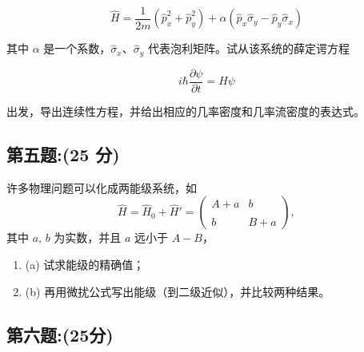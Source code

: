 \begin{equation}
    \hat{H} = \frac{1}{2m} \left( \hat{p}_x^2 + \hat{p}_y^2 \right) + \alpha \left( \hat{p}_x \hat{\sigma}_y - \hat{p}_y \hat{\sigma}_x \right)~
\end{equation}

其中 $\alpha$ 是一个系数，$\hat{\sigma}_x$、$\hat{\sigma}_y$ 代表泡利矩阵。试从该系统的薛定谔方程

\begin{equation}
    i \hbar \frac{\partial \psi}{\partial t} = H \psi~
\end{equation}

出发，导出连续性方程，并给出相应的几率密度和几率流密度的表达式。
\subsection{第五题:(25 分)}
许多物理问题可以化成两能级系统，如
\[\hat{H} = \hat{H}_0 + \hat{H}' = \begin{pmatrix} A + a & b \\\\ b & B +a \end{pmatrix},~\]
其中 \(a\), \(b\) 为实数，并且 \(a\) 远小于 \(A - B\)，

\begin{enumerate}
    \item (a) 试求能级的精确值；
    \item (b) 再用微扰公式写出能级（到二级近似），并比较两种结果。
\end{enumerate}
\subsection{第六题:(25分)}